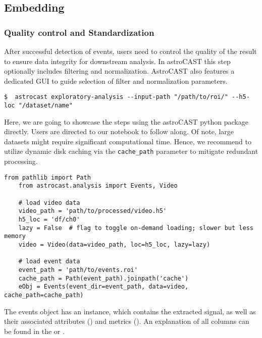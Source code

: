 \subsection{Embedding}\label{subsec:embedding}

\subsubsection{Quality control and Standardization}\label{subsubsec:quality-control}

After successful detection of events, users need to control the quality of the result to ensure data integrity for downstream analysis. In astroCAST this step optionally includes filtering and normalization. AstroCAST also features a dedicated GUI to guide selection of filter and normalization parameters.

\begin{lstlisting}[style=bashStyle]
    $  astrocast exploratory-analysis --input-path "/path/to/roi/" --h5-loc "/dataset/name"
\end{lstlisting}

Here, we are going to showcase the steps using the astroCAST python package directly. Users are directed to our  notebook to follow along. Of note, large datasets might require significant computational time. Hence, we recommend to utilize dynamic disk caching via the \lstinline[language=python]{cache_path} parameter to mitigate redundant processing.

\begin{lstlisting}[style=pyStyle]
    from pathlib import Path
    from astrocast.analysis import Events, Video

    # load video data
    video_path = 'path/to/processed/video.h5'
    h5_loc = 'df/ch0'
    lazy = False  # flag to toggle on-demand loading; slower but less memory
    video = Video(data=video_path, loc=h5_loc, lazy=lazy)

    # load event data
    event_path = 'path/to/events.roi'
    cache_path = Path(event_path).joinpath('cache')
    eObj = Events(event_dir=event_path, data=video, cache_path=cache_path)

\end{lstlisting}

The events object has an  instance, which contains the extracted signal, as well as  their associated attributes () and metrics (). An explanation of all columns can be found in the  or .

